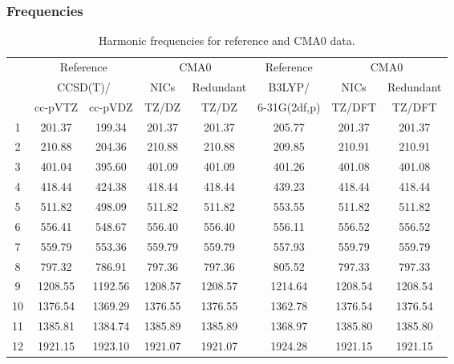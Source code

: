 \documentclass[10pt,oneside]{article}
\begin{document}
\begin{table}[h!]
\subsubsection*{Frequencies}
\centering
\caption{Harmonic frequencies for reference and CMA0 data.}
\begin{tabular}{cccccccc}
\toprule
{} & \multicolumn{2}{c}{Reference} & \multicolumn{2}{c}{CMA0} &    Reference & \multicolumn{2}{c}{CMA0} \\
{} & \multicolumn{2}{c}{CCSD(T)/} &    NICs &  Redundant &       B3LYP/ &    NICs & Redundant \\
{} &   cc-pVTZ & cc-pVDZ &   TZ/DZ &      TZ/DZ & 6-31G(2df,p) &  TZ/DFT &    TZ/DFT \\
\midrule
1  &    201.37 &  199.34 &  201.37 &     201.37 &       205.77 &  201.37 &    201.37 \\
2  &    210.88 &  204.36 &  210.88 &     210.88 &       209.85 &  210.91 &    210.91 \\
3  &    401.04 &  395.60 &  401.09 &     401.09 &       401.26 &  401.08 &    401.08 \\
4  &    418.44 &  424.38 &  418.44 &     418.44 &       439.23 &  418.44 &    418.44 \\
5  &    511.82 &  498.09 &  511.82 &     511.82 &       553.55 &  511.82 &    511.82 \\
6  &    556.41 &  548.67 &  556.40 &     556.40 &       556.11 &  556.52 &    556.52 \\
7  &    559.79 &  553.36 &  559.79 &     559.79 &       557.93 &  559.79 &    559.79 \\
8  &    797.32 &  786.91 &  797.36 &     797.36 &       805.52 &  797.33 &    797.33 \\
9  &   1208.55 & 1192.56 & 1208.57 &    1208.57 &      1214.64 & 1208.54 &   1208.54 \\
10 &   1376.54 & 1369.29 & 1376.55 &    1376.55 &      1362.78 & 1376.54 &   1376.54 \\
11 &   1385.81 & 1384.74 & 1385.89 &    1385.89 &      1368.97 & 1385.80 &   1385.80 \\
12 &   1921.15 & 1923.10 & 1921.07 &    1921.07 &      1924.28 & 1921.15 &   1921.15 \\
\bottomrule
\end{tabular}
\end{table}
\end{document}
